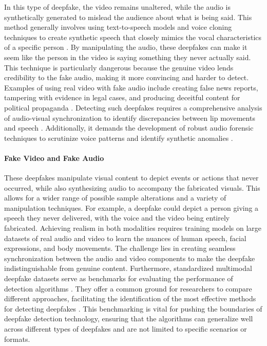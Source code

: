 In this type of deepfake, the video remains unaltered, while the audio is synthetically generated to mislead the audience about what is being said. This method generally involves using text-to-speech models and voice cloning techniques to create synthetic speech that closely mimics the vocal characteristics of a specific person \cite{deng2020unsupervised, kinnunen2017asvspoof, polyak2019tts}. By manipulating the audio, these deepfakes can make it seem like the person in the video is saying something they never actually said. This technique is particularly dangerous because the genuine video lends credibility to the fake audio, making it more convincing and harder to detect. Examples of using real video with fake audio include creating false news reports, tampering with evidence in legal cases, and producing deceitful content for political propaganda \cite{sankaranarayanan2021presidential}. Detecting such deepfakes requires a comprehensive analysis of audio-visual synchronization to identify discrepancies between lip movements and speech \cite{agarwal2020detecting}. Additionally, it demands the development of robust audio forensic techniques to scrutinize voice patterns and identify synthetic anomalies \cite{almutairi2022review}.

\paragraph{Fake Video and Fake Audio}
\label{para:multimodal_fakeV_fakeA}

These deepfakes manipulate visual content to depict events or actions that never occurred, while also synthesizing audio to accompany the fabricated visuals.  This allows for a wider range of possible sample alterations and a variety of manipulation techniques. For example, a deepfake could depict a person giving a speech they never delivered, with the voice and the video being entirely fabricated. Achieving realism in both modalities requires training models on large datasets of real audio and video to learn the nuances of human speech, facial expressions, and body movements. The challenge lies in creating seamless synchronization between the audio and video components to make the deepfake indistinguishable from genuine content. Furthermore, standardized multimodal deepfake datasets serve as benchmarks for evaluating the performance of detection algorithms \cite{dolhansky2020deepfake, khalid2021fakeavceleb, hou2024polyglotfake}. They offer a common ground for researchers to compare different approaches, facilitating the identification of the most effective methods for detecting deepfakes \cite{liu2023magnifying, cheng2023voice, feng2023self}. This benchmarking is vital for pushing the boundaries of deepfake detection technology, ensuring that the algorithms can generalize well across different types of deepfakes and are not limited to specific scenarios or formats.

